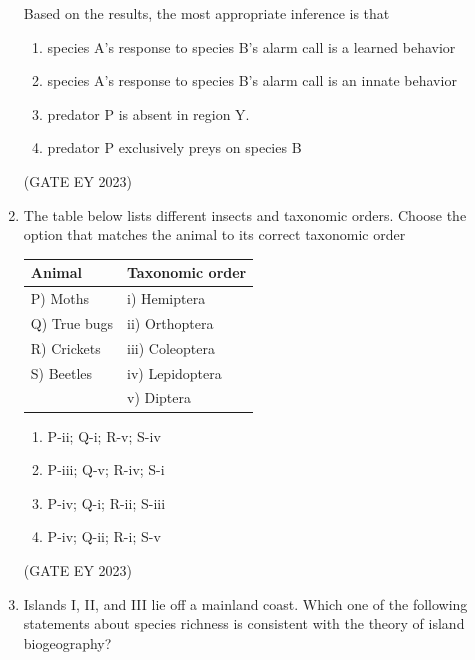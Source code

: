 \documentclass[journal,12pt,onecolumn]{IEEEtran}
\theoremstyle{remark}
\begin{document}
\begin{enumerate}
Based on the results, the most appropriate inference is that
\begin{enumerate}

\item species A's response to species B's alarm call is a learned behavior
\item species A's response to species B's alarm call is an innate behavior
\item predator P is absent in region Y.
\item predator P exclusively preys on species B


\end{enumerate}

\hfill{(GATE EY 2023)}


 \item The table below lists different insects and taxonomic orders. Choose the option
that matches the animal to its correct taxonomic order

\begin{table}[h!]
\centering
\begin{tabular}{|l|l|}
\hline
\textbf{Animal} & \textbf{Taxonomic order} \\ \hline
P) Moths        & i) Hemiptera     \\ \hline
Q) True bugs    & ii) Orthoptera   \\ \hline
R) Crickets     & iii) Coleoptera  \\ \hline
S) Beetles      & iv) Lepidoptera  \\ \hline
                & v) Diptera       \\ \hline
\end{tabular}
\end{table}



\begin{enumerate}

\item P-ii; Q-i; R-v; S-iv
\item P-iii; Q-v; R-iv; S-i
\item P-iv; Q-i; R-ii; S-iii
\item P-iv; Q-ii; R-i; S-v


\end{enumerate}
\hfill{(GATE EY 2023)}

 \item Islands I, II, and III lie off a mainland coast. Which one of the following
statements about species richness is consistent with the theory of island
biogeography?



\end{enumerate}
\end{document}

